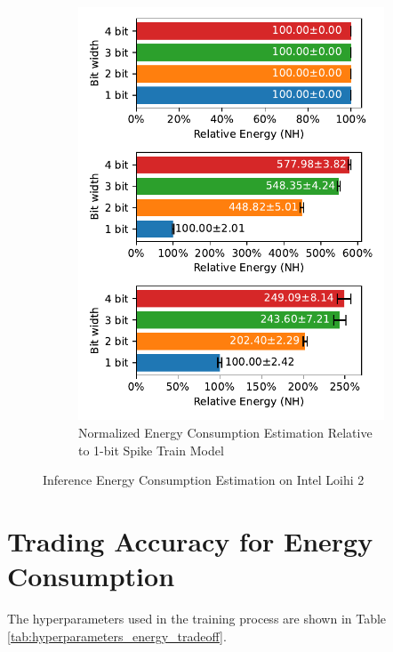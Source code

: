         \begin{figure}[H]
            \centering
            \ContinuedFloat
            \begin{subfigure}[H]{0.7\textwidth}
                \centering
                \includegraphics[width=\textwidth]{../standard/CIFAR10/plots/cifar10_test_relative_energy_nh.pdf}
                \caption{Normalized Energy Consumption Estimation Relative to 1-bit Spike Train Model}
            \end{subfigure}
            \caption{Inference Energy Consumption Estimation on Intel Loihi 2}
        \end{figure}

\section{Trading Accuracy for Energy Consumption}
\label{appendix:energy_tradeoff}

    The hyperparameters used in the training process are shown in Table \ref{tab:hyperparameters_energy_tradeoff}.


